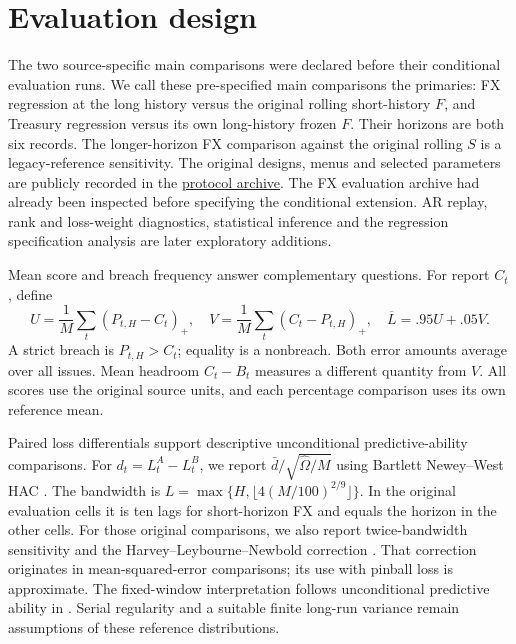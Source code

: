 \section{Evaluation design}
The two source-specific main comparisons were declared before their conditional evaluation runs. We call these pre-specified main comparisons the primaries: FX regression at the long history versus the original rolling short-history $F$, and Treasury regression versus its own long-history frozen $F$. Their horizons are both six records. The longer-horizon FX comparison against the original rolling $S$ is a legacy-reference sensitivity. The original designs, menus and selected parameters are publicly recorded in the \href{https://github.com/ByronLi0207/financial-mathematics-paper-20261020/tree/main/protocol}{protocol archive}. The FX evaluation archive had already been inspected before specifying the conditional extension. AR replay, rank and loss-weight diagnostics, statistical inference and the regression specification analysis are later exploratory additions.

Mean score and breach frequency answer complementary questions. For report $C_t$, define
\begin{equation}\label{eq:score}
U=\frac1M\sum_t(P_{t,H}-C_t)_+,\quad V=\frac1M\sum_t(C_t-P_{t,H})_+,\quad \overline L=.95U+.05V.
\end{equation}
A strict breach is $P_{t,H}>C_t$; equality is a nonbreach. Both error amounts average over all issues. Mean headroom $C_t-B_t$ measures a different quantity from $V$. All scores use the original source units, and each percentage comparison uses its own reference mean.

Paired loss differentials support descriptive unconditional predictive-ability comparisons. For $d_t=L_t^A-L_t^B$, we report $\bar d/\sqrt{\widehat\Omega/M}$ using Bartlett Newey--West HAC \citep{diebold1995,newey1987}. The bandwidth is $L=\max\{H,\lfloor4(M/100)^{2/9}\rfloor\}$. In the original evaluation cells it is ten lags for short-horizon FX and equals the horizon in the other cells. For those original comparisons, we also report twice-bandwidth sensitivity and the Harvey--Leybourne--Newbold correction \citep{harvey1997}. That correction originates in mean-squared-error comparisons; its use with pinball loss is approximate. The fixed-window interpretation follows unconditional predictive ability in \citet{giacomini2006}. Serial regularity and a suitable finite long-run variance remain assumptions of these reference distributions.


